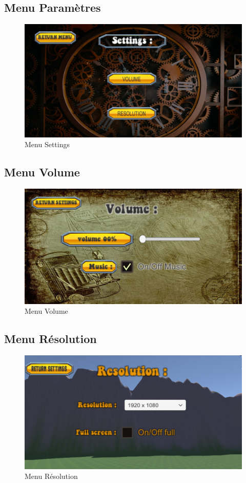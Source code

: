 \documentclass[a4paper, 11pt]{article}
\begin{document}
	\subsection{Menu Paramètres}
	\begin{figure}[!ht]
		\centering
		\includegraphics[scale=0.3]{images/settings.png}
		\caption{Menu Settings}
	\end{figure}
	
	\clearpage
	
	\subsection{Menu Volume}
	\begin{figure}[!ht]
		\centering
		\includegraphics[scale=0.3]{images/volume.png}
		\caption{Menu Volume}
	\end{figure}
	
	\subsection{Menu Résolution}
	\begin{figure}[!ht]
		\centering
		\includegraphics[scale=0.3]{images/resolution.png}
		\caption{Menu Résolution}
	\end{figure}
	
\end{document}
